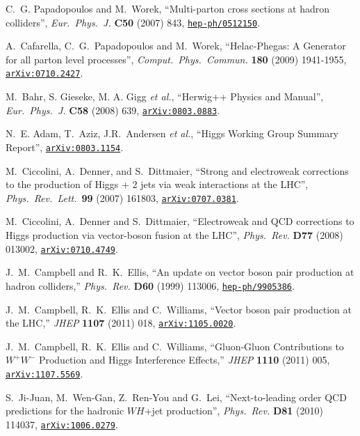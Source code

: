 \documentclass[english,12pt]{article}
\begin{document}
\begin{thebibliography}{10}
C.~G. Papadopoulos and M.~Worek, ``{Multi-parton cross sections at hadron
  colliders}'', {\em Eur.\ Phys.\ J.} {\bf C50} (2007) 843,
\href{https://www.arXiv.org/abs/hep-ph/0512150}{{\tt hep-ph/0512150}}.

  A.~Cafarella, C.~G.~Papadopoulos and M.~Worek,
  ``{Helac-Phegas: A Generator for all parton level processes}'',
  {\em Comput.\ Phys.\ Commun.}  {\bf 180} (2009)  1941-1955,
 \href{https://arxiv.org/abs/0710.2427} {{\tt arXiv:0710.2427}}.

  M.~Bahr, S. Gieseke, M. A. Gigg {\it et al.},
  ``{Herwig++ Physics and Manual}'',
  {\em Eur.\ Phys.\ J.} {\bf C58} (2008) 639,
  \href{https://www.arXiv.org/abs/0803.0883}{{\tt arXiv:0803.0883}}.

N.~E. Adam, T.~Aziz, J.R.~Andersen {\em et al.}, ``{Higgs Working Group Summary Report}'',
\href{https://www.arXiv.org/abs/0803.1154}{{\tt arXiv:0803.1154}}.

M.~Ciccolini, A.~Denner, and S.~Dittmaier, ``{Strong and electroweak
  corrections to the production of Higgs + 2 jets via weak interactions at the
  LHC}'', {\em Phys.\ Rev.\ Lett.}~{\bf 99} (2007) 161803,
\href{https://www.arXiv.org/abs/0707.0381}{{\tt arXiv:0707.0381}}.

M.~Ciccolini, A.~Denner and S.~Dittmaier, ``{Electroweak and QCD corrections
  to Higgs production via vector-boson fusion at the LHC}'', {\em Phys.\ Rev.}
  {\bf D77} (2008) 013002,
\href{https://www.arXiv.org/abs/0710.4749}{{\tt arXiv:0710.4749}}.

  J.~M.~Campbell and R.~K.~Ellis,
  ``An update on vector boson pair production at hadron colliders,''
  {\em Phys.\ Rev.} {\bf D60} (1999) 113006,
  \href{https://www.arXiv.org/abs/hep-ph/9905386}{{\tt hep-ph/9905386}}.

  J.~M.~Campbell, R.~K.~Ellis and C.~Williams,
  ``Vector boson pair production at the LHC,''
  {\em JHEP} {\bf 1107} (2011) 018,
  \href{https://www.arXiv.org/abs/1105.0020}{{\tt arXiv:1105.0020}}.

  J.~M.~Campbell, R.~K.~Ellis and C.~Williams,
  ``Gluon-Gluon Contributions to $W^{+}W^{-}$ Production and Higgs Interference Effects,''
  {\em JHEP} {\bf 1110} (2011) 005,
  \href{https://www.arXiv.org/abs/1107.5569}{{\tt arXiv:1107.5569}}.

  S.~Ji-Juan, M.~Wen-Gan, Z.~Ren-You and G.~Lei,
  ``{Next-to-leading order QCD predictions for the hadronic $WH$+jet production}'',
  {\em Phys.\ Rev.} {\bf D81} (2010) 114037,
\href{https://www.arXiv.org/abs/1006.0279}{{\tt arXiv:1006.0279}}.


\end{thebibliography}
\end{document}
